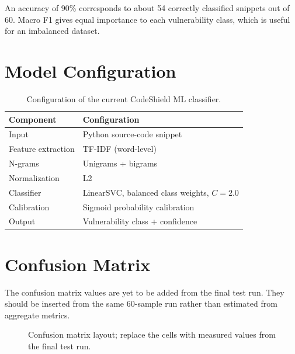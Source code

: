 \documentclass[12pt,a4paper]{report}
\begin{document}
An accuracy of 90\% corresponds to about 54 correctly classified snippets out of 60. Macro F1 gives equal importance to each vulnerability class, which is useful for an imbalanced dataset.

\section{Model Configuration}
\begin{table}[H]
\centering
\caption{Configuration of the current CodeShield ML classifier.}
\begin{tabular}{ll}
\toprule
\textbf{Component} & \textbf{Configuration}\\
\midrule
Input & Python source-code snippet\\
Feature extraction & TF-IDF (word-level)\\
N-grams & Unigrams + bigrams\\
Normalization & L2\\
Classifier & LinearSVC, balanced class weights, $C=2.0$\\
Calibration & Sigmoid probability calibration\\
Output & Vulnerability class + confidence\\
\bottomrule
\end{tabular}
\end{table}

\section{Confusion Matrix}
The confusion matrix values are yet to be added from the final test run. They should be inserted from the same 60-sample run rather than estimated from aggregate metrics.

\begin{figure}[H]
\centering
{}
\caption{Confusion matrix layout; replace the cells with measured values from the final test run.}
\end{figure}

\end{document}
